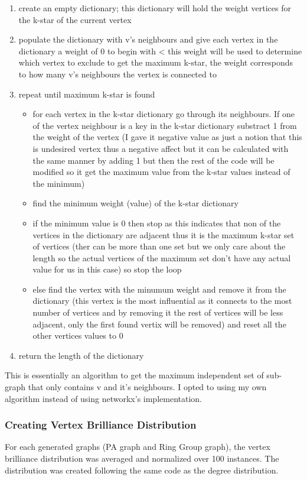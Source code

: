 \documentclass[11pt,a4paper,notitlepage]{article}
\begin{document}
\begin{enumerate}
    \item create an empty dictionary; this dictionary will hold the weight vertices for the k-star of the current vertex 
    \item populate the dictionary with v's neighbours and give each vertex in the dictionary a weight of 0 to begin with < this weight will be used to determine which vertex to exclude to get the maximum k-star, the weight corresponds to how many v's neighbours the vertex is connected to
    \item repeat until maximum k-star is found
    \begin{itemize}
        \item for each vertex in the k-star dictionary go through its neighbours. If one of the vertex neighbour is a key in the k-star dictionary substract 1 from the weight of the vertex (I gave it negative value as just a notion that this is undesired vertex thus a negative affect but it can be calculated with the same manner by adding 1 but then the rest of the code will be modified so it get the maximum value from the k-star values instead of the minimum)
        \item find the minimum weight (value) of the k-star dictionary 
        \item if the minimum value is 0 then stop as this indicates that non of the vertices in the dictionary are adjacent thus it is the maximum k-star set of vertices (ther can be more than one set but we only care about the length so the actual vertices of the maximum set don't have any actual value for us in this case) so stop the loop
        \item else find the vertex with the minumum weight and remove it from the dictionary (this vertex is the most influential as it connects to the most number of vertices and by removing it the rest of vertices will be less adjacent, only the first found vertix will be removed) and reset all the other vertices values to 0 
    \end{itemize}
    \item return the length of the dictionary 
\end{enumerate}
This is essentially an algorithm to get the maximum independent set of sub-graph that only contains v and it's neighbours. I opted to using my own algorithm instead of using networkx's implementation. 
\subsubsection*{Creating Vertex Brilliance Distribution}
For each generated graphs (PA graph and Ring Group graph), the vertex brilliance distribution was averaged and normalized over 100 instances. The distribution was created following the same code as the degree distribution.
\end{document}
